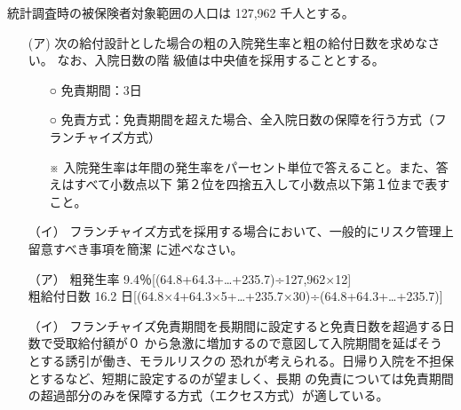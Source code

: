 \documentclass[report,gutter=10mm,fore-edge=10mm,uplatex,dvipdfmx]{jlreq}
\begin{document}
統計調査時の被保険者対象範囲の人口は 127,962 千人とする。
\begin{itemize}
 \item [ (ア)]
 次の給付設計とした場合の粗の入院発生率と粗の給付日数を求めなさい。 なお、入院日数の階
 級値は中央値を採用することとする。
\begin{itemize}
 \item [○] 免責期間：3日
 \item [○] 免責方式：免責期間を超えた場合、全入院日数の保障を行う方式（フランチャイズ方式）
 \item [※]  入院発生率は年間の発生率をパーセント単位で答えること。また、答えはすべて小数点以下
 第２位を四捨五入して小数点以下第１位まで表すこと。
\end{itemize} 
 \item [（イ）]
 フランチャイズ方式を採用する場合において、一般的にリスク管理上留意すべき事項を簡潔
 に述べなさい。
\end{itemize}
\begin{itemize}
 \item [（ア）]  粗発生率 9.4％[(64.8+64.3+…+235.7)÷127,962×12]\\
       粗給付日数 16.2 日[(64.8×4+64.3×5+…+235.7×30)÷(64.8+64.3+…+235.7)]
 \item [（イ）] フランチャイズ免責期間を長期間に設定すると免責日数を超過する日数で受取給付額が０
  から急激に増加するので意図して入院期間を延ばそうとする誘引が働き、モラルリスクの
 恐れが考えられる。日帰り入院を不担保とするなど、短期に設定するのが望ましく、長期
 の免責については免責期間の超過部分のみを保障する方式（エクセス方式）が適している。
\end{itemize}
\end{document}
